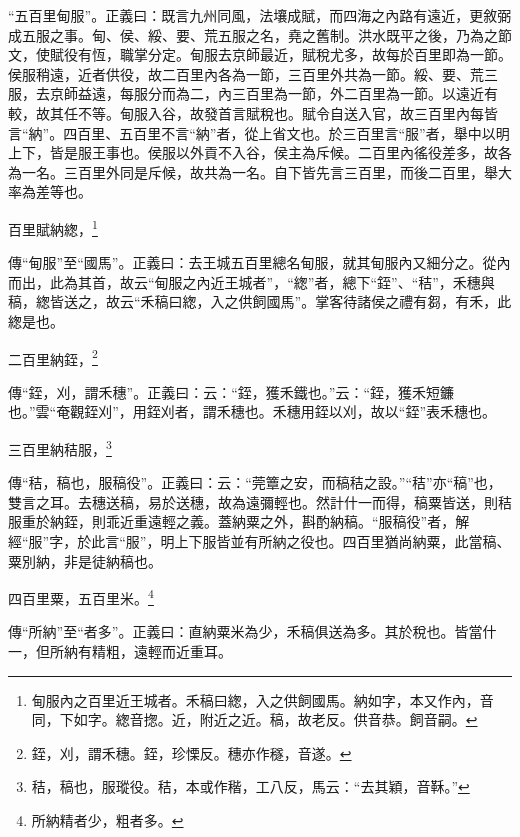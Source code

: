 {\noindent\shu{}\fzkt “五百里甸服”。正義曰：既言九州同風，法壤成賦，而四海之內路有遠近，更敘弼成五服之事。甸、侯、綏、要、荒五服之名，堯之舊制。洪水既平之後，乃為之節文，使賦役有恆，職掌分定。甸服去京師最近，賦稅尤多，故每於百里即為一節。侯服稍遠，近者供役，故二百里內各為一節，三百里外共為一節。綏、要、荒三服，去京師益遠，每服分而為二，內三百里為一節，外二百里為一節。以遠近有較，故其任不等。甸服入谷，故發首言賦稅也。賦令自送入官，故三百里內每皆言“納”。四百里、五百里不言“納”者，從上省文也。於三百里言“服”者，舉中以明上下，皆是服王事也。侯服以外貢不入谷，侯主為斥候。二百里內徭役差多，故各為一名。三百里外同是斥候，故共為一名。自下皆先言三百里，而後二百里，舉大率為差等也。 \par}

百里賦納緫，\footnote{甸服內之百里近王城者。禾稿曰緫，入之供飼國馬。納如字，本又作內，音同，下如字。緫音揔。近，附近之近。稿，故老反。供音恭。飼音嗣。}

{\noindent\zhuan{}\fzbyks 傳“甸服”至“國馬”。正義曰：去王城五百里總名甸服，就其甸服內又細分之。從內而出，此為其首，故云“甸服之內近王城者”，“緫”者，總下“銍”、“秸”，禾穗與稿，緫皆送之，故云“禾稿曰緫，入之供飼國馬”。掌客待諸侯之禮有芻，有禾，此緫是也。 \par}

二百里納銍，\footnote{銍，刈，謂禾穗。銍，珍慄反。穗亦作穟，音遂。}

{\noindent\zhuan{}\fzbyks 傳“銍，刈，謂禾穗”。正義曰：云：“銍，獲禾鐵也。”云：“銍，獲禾短鐮也。”雲“奄觀銍刈”，用銍刈者，謂禾穗也。禾穗用銍以刈，故以“銍”表禾穗也。 \par}

三百里納秸服，\footnote{秸，稿也，服瑽役。秸，本或作稭，工八反，馬云：“去其穎，音鞂。”}

{\noindent\zhuan{}\fzbyks 傳“秸，稿也，服稿役”。正義曰：云：“莞簟之安，而稿秸之設。”“秸”亦“稿”也，雙言之耳。去穗送稿，易於送穗，故為遠彌輕也。然計什一而得，稿粟皆送，則秸服重於納銍，則乖近重遠輕之義。蓋納粟之外，斟酌納稿。“服稿役”者，解經“服”字，於此言“服”，明上下服皆並有所納之役也。四百里猶尚納粟，此當稿、粟別納，非是徒納稿也。 \par}

四百里粟，五百里米。\footnote{所納精者少，粗者多。}

{\noindent\zhuan{}\fzbyks 傳“所納”至“者多”。正義曰：直納粟米為少，禾稿俱送為多。其於稅也。皆當什一，但所納有精粗，遠輕而近重耳。 \par}

